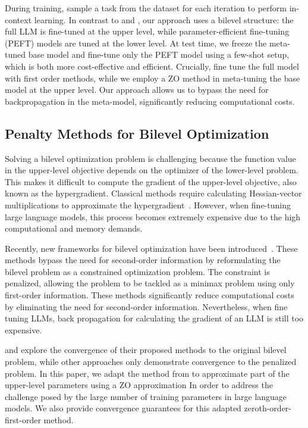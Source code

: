 During training, \citet{MinLZH22MetaICL} sample a task from the dataset for each iteration to perform in-context learning. In contrast to \citet{ZhongLZK21} and \citet{MinLZH22MetaICL}, our approach uses a bilevel structure: the full LLM is fine-tuned at the upper level, while parameter-efficient fine-tuning (PEFT) models are tuned at the lower level. At test time, we freeze the meta-tuned base model and fine-tune only the PEFT model using a few-shot setup, which is both more cost-effective and efficient. Crucially, \citet{MinLZH22MetaICL} fine tune the full model with first order methods, while we employ a ZO method in meta-tuning the base model at the upper level. Our approach allows us to bypass the need for backpropagation in the meta-model, significantly reducing computational costs.
 
\subsection{Penalty Methods for Bilevel Optimization}

Solving a bilevel optimization problem is challenging because the function value in the upper-level objective depends on the optimizer of the lower-level problem. This makes it difficult to compute the gradient of the upper-level objective, also known as the hypergradient. Classical methods require calculating Hessian-vector multiplications to approximate the hypergradient~\citep{FrDoFrPo17, FrFrSaGrPo18, FiAbLe17, LiGuHu21, RaFiKaLe19, GhWa18, ChKaZh22, LiXiFeZhYoPiUZ18}. However, when fine-tuning large language models, this process becomes extremely expensive due to the high computational and memory demands.

Recently, new frameworks for bilevel optimization have been introduced~\citep{LuMei24, ShenC23, LiuLYZZ24, KwonKWN23, LiuYWSL22}. These methods bypass the need for second-order information by reformulating the bilevel problem as a constrained optimization problem. The constraint is penalized, allowing the problem to be tackled as a minimax problem using only first-order information. These methods significantly reduce computational costs by eliminating the need for second-order information. Nevertheless, when fine tuning LLMs, back propagation for calculating the gradient of an LLM is still too expensive.

\citet{LiuLYZZ24} and \citet{LuMei24} explore the convergence of their proposed methods to the original bilevel problem, while other approaches only demonstrate convergence to the penalized problem. In this paper, we adapt the method from \citet{LuMei24} to approximate part of the upper-level parameters using a ZO approximation In order  to address the challenge posed by the large number of training parameters in large language models. We also provide convergence guarantees for this adapted zeroth-order-first-order method.


